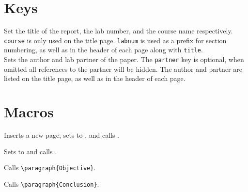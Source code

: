 \documentclass{l3doc}
\begin{document}
\section{Keys}

Set the title of the report, the lab number, and the course name respectively. \texttt{course} is only used on the title page. \texttt{labnum} is used as a prefix for section numbering, as well as in the header of each page along with \texttt{title}.\\

Sets the author and lab partner of the paper. The \texttt{partner} key is optional, when omitted all references to the partner will be hidden. The author and partner are listed on the title page, as well as in the header of each page.\\

\section{Macros}
\begin{function}{\task}
  \begin{syntax}
  \end{syntax}
  Inserts a new page, sets  to , and calls .
\end{function}

\begin{function}{\subtask}
  \begin{syntax}
  \end{syntax}
  Sets  to  and calls .
\end{function}

\begin{function}{\objective}
  Calls \verb|\paragraph{Objective}|.
\end{function}

\begin{function}{\conclusion}
  Calls \verb|\paragraph{Conclusion}|.
\end{function}
\end{document}
